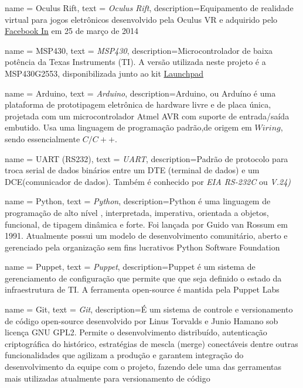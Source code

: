 {
	name = Oculus Rift,
	text = \textit{Oculus Rift},
	description={Equipamento de realidade virtual para jogos eletrônicos desenvolvido pela Oculus VR e adquirido pelo \href{https://www.facebook.com/facebook}{Facebook In} em 25 de março de 2014}
}

{
	name = MSP430,
	text = \textit{MSP430},
	description={Microcontrolador de baixa potência da Texas Instruments (TI). A versão utilizada neste projeto é a MSP430G2553, disponibilizada junto ao kit \href{http://www.ti.com/tool/msp-exp430g2}{Launchpad}}
}


{
	name = Arduino,
	text = \textit{Arduino},
	description={Arduino, ou Arduíno é uma plataforma de prototipagem eletrônica de hardware livre e de placa única, projetada com um microcontrolador Atmel AVR com suporte de entrada/saída embutido. Usa uma linguagem de programação padrão,de origem em $Wiring$, sendo essencialmente $C/C++$.}
}

{
	name = UART (RS232),
	text = \textit{UART},
	description={Padrão de protocolo para troca serial de dados binários entre um DTE (terminal de dados) e um DCE(comunicador de dados). Também é conhecido por \textit{EIA RS-232C} ou \textit{V.24)}}
}

{
	name = Python,
	text = \textit{Python},
	description={Python é uma linguagem de programação de alto nível , interpretada, imperativa, orientada a objetos, funcional, de tipagem dinâmica e forte. Foi lançada por Guido van Rossum em 1991\cite{python_history}. Atualmente possui um modelo de desenvolvimento comunitário, aberto e gerenciado pela organização sem fins lucrativos Python Software Foundation}
}

{
	name = Puppet,
	text = \textit{Puppet},
	description={Puppet é um sistema de gerenciamento de configuração que permite que que seja definido o estado da infraestrutura de TI. A ferramenta open-source é mantida pela Puppet Labs}
}

{
	name = Git,
	text = \textit{Git},
	description={É um sistema de controle e versionamento de código open-source desenvolvido por Linus Torvalds e Junio Hamano sob licença GNU GPL2. Permite o desenvolvimento distribuído, autenticação criptográfica do histórico, estratégias de mescla (merge) conectáveis dentre outras funcionalidades que agilizam a produção e garantem integração do desenvolvimento da equipe com o projeto, fazendo dele uma das gerramentas mais utilizadas atualmente para versionamento de código}
}

